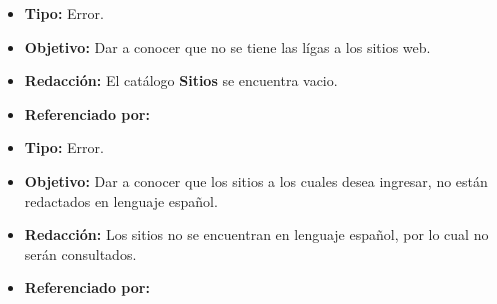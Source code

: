   
    \begin{itemize}
      \item \textbf{Tipo:} Error. 
      \item \textbf{Objetivo:}  Dar a conocer que no se tiene las lígas a los sitios web.
      \item \textbf{Redacción:} El catálogo \textbf{Sitios} se encuentra vacio.
      \item \textbf{Referenciado por:} \\
    \end{itemize}

    \begin{itemize}
      \item \textbf{Tipo:} Error. 
      \item \textbf{Objetivo:}  Dar a conocer que los sitios a los cuales desea ingresar, no están redactados en lenguaje español.
      \item \textbf{Redacción:} Los sitios no se encuentran en lenguaje español, por lo cual no serán consultados.
      \item \textbf{Referenciado por:} \\
    \end{itemize}